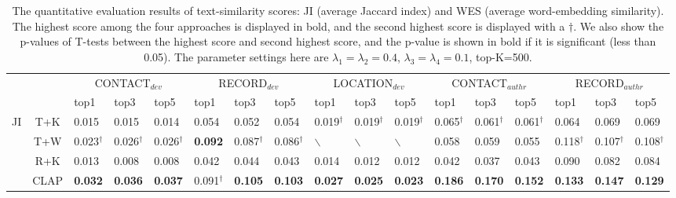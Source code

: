 \begin{table}[h]
\vspace{-0.1in}
\caption{The quantitative evaluation results of text-similarity scores: JI (average Jaccard index) and WES (average word-embedding similarity). The highest score among the four approaches is displayed in bold, and the second highest score is displayed with a $\dagger$. We also show the p-values of T-tests between the highest score and second highest score, and the p-value is shown in bold if it is significant (less than 0.05). The parameter settings here are $\lambda_1=\lambda_2=0.4$, $\lambda_3=\lambda_4=0.1$, top-K=500.  \label{tab:result}}
\vspace{-0.1in}
\begin{center}
    \begin{tabular}{|c|c||p{0.55cm}|p{0.55cm}|p{0.55cm}||p{0.55cm}|p{0.55cm}|p{0.55cm}||p{0.55cm}|p{0.55cm}|p{0.55cm}||p{0.55cm}|p{0.55cm}|p{0.55cm}||p{0.55cm}|p{0.55cm}|p{0.55cm}|}
    \hline
 \multicolumn{2}{|l||}{\multirow{2}{*}{}} & \multicolumn{3}{c||}{ \textsf{CONTACT}$_{dev}$} & \multicolumn{3}{c||}{\textsf{RECORD}$_{dev}$} & \multicolumn{3}{c||}{ \textsf{LOCATION}$_{dev}$} &\multicolumn{3}{c||}{ \textsf{CONTACT}$_{authr}$} &\multicolumn{3}{c|}{ \textsf{RECORD}$_{authr}$}\\ \cline{3-17}
 \multicolumn{2}{|l||}{} & top1 & top3 & top5 & top1 & top3 & top5 & top1 & top3 & top5 & top1 & top3 & top5 & top1 & top3 & top5\\ \hline
 \multirow{5}{*}{JI} & T+K  & 0.015& 0.015& 0.014 & 0.054 & 0.052 & 0.054 & 0.019$^{\dagger}$ & 0.019$^{\dagger}$ & 0.019$^{\dagger}$ & 0.065$^{\dagger}$& 0.061$^{\dagger}$ & 0.061$^{\dagger}$ & 0.064 &0.069 & 0.069 \\ \cline{2-17}
 & T+W   & 0.023$^{\dagger}$&0.026$^{\dagger}$ & 0.026$^{\dagger}$ & \textbf{0.092} & 0.087$^{\dagger}$ & 0.086$^{\dagger}$ & $\backslash$ & $\backslash$ & $\backslash$ & 0.058 & 0.059&0.055 & 0.118$^{\dagger}$& 0.107$^{\dagger}$ & 0.108$^{\dagger}$ \\ \cline{2-17}
 & R+K &0.013&0.008& 0.008 & 0.042& 0.044 & 0.043 & 0.014 &0.012 & 0.012 & 0.042 & 0.037& 0.043&  0.090 & 0.082 & 0.084 \\ \cline{2-17}
 & CLAP  & \textbf{0.032}&\textbf{0.036}& \textbf{0.037} & 0.091$^{\dagger}$ & \textbf{0.105} & \textbf{0.103} & \textbf{0.027} & \textbf{0.025} & \textbf{0.023} & \textbf{0.186} & \textbf{0.170}& \textbf{0.152} & \textbf{0.133} & \textbf{0.147} & \textbf{0.129} \\ \cline{2-17}

\end{tabular}
\end{center}
\end{table}
